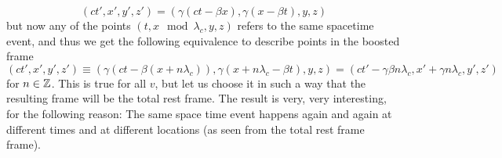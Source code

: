 \[
(ct',x',y',z') = (\gamma(ct-\beta x),\gamma(x - \beta t),y,z) 
\]
but now any of the points $(t,x \mod \lambda_c ,y,z)$ refers to the same spacetime event, and thus we get the following equivalence to describe points in the boosted frame
\[ (ct',x',y',z') \equiv (\gamma(ct-\beta (x+n\lambda_c)),\gamma(x+n\lambda_c - \beta t),y,z) = (ct'-\gamma\beta n \lambda_c,x'+\gamma n \lambda_c,y',z') \]
for $n\in\mathbb{Z}$. This is true for all $v$, but let us choose it in such a way that the resulting frame will be the total rest frame. The result is very, very interesting, for the following reason: The same space time event happens again and again at different times and at different locations (as seen from the total rest frame frame). 

 
\begin{comment}
We will assume that in the cylindrical the speed of light is still equal to $c$ in all initial reference frames. However, as we will see, it is not necessarily true anymore that the any two initial reference are identical.  \par 
In this universe, sending out a light pulse simultaneously will result in it coming back from both the $+x$ and the $-x$ direction, after two different time intervals $T_+$ and $T_-$. It is easy to see conceptually how such an asymmetry can arise in a cylindrical universe. Suppose our base ship is moving at some velocity $u$ in the $+x$ direction and sends out a light pulse at some time $t_0$. Since $c$ is finite, the ship will continue to travel in the $+x$ direction while the light travels all the way around. However, because of that, the light that was sent in the $-x$ direction will meet the ship earlier than the light sent into the $+x$ direction (since it had to travel less and both light pulses move at the same speed). \par 
A perhaps easier and more intuitive way to think about this is to recall the use of simultaneity of events in inertial reference frames: Given some local spacetime event in our initial reference frame, all those events are simultaneous which would be reached by a light pulse emitted directly at the original spacetime event. Thus at any given instant, our ship is simultaneous with a copy of itself, whose internal clock has already advanced by $T_+$ and is located at a distance of $T_+c$ in the $+x$ direction and another copy of itself whose internal clock has advanced by $T_-$ located a distance of $T_-$ in the $-x$ direction. \par 
The analysis of the twin paradox becomes now rather routine: Suppose we are sending out a probe in the $+x$ direction. Then, to reach the ship in the positive $x$ direction, the probe has to move a distance of $T_+c$. Due to length contraction, according to a clock on the probe, the journey takes a total time of \[t=\frac{T_+c}{v\gamma} = T_+\sqrt{c^2/v^2-1}\], on the other hand, seen from the copy of the ship at $x=T_+x$, the probe is emitted by the ship in the middle, when the internal clock of the "copy" has already advanced by $T_+$. Thus the time as seen in the frame of the ship is given by
\[ t_s = T_+(1+\frac{c}{v}) \]
\end{comment}

